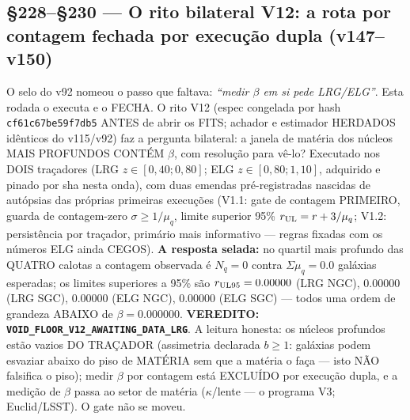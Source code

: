 \documentclass[11pt]{article}
\theoremstyle{definition}\newtheorem{deriv}{Derivação}
\begin{document}
\subsection*{\S228--\S230 --- O rito bilateral V12: a rota por contagem fechada por execução dupla (v147--v150)}O selo do v92 nomeou o passo que faltava: \emph{``medir $\beta$ em si pede LRG/ELG''}. Esta rodada o executa e o FECHA. O rito V12 (espec congelada por hash \texttt{cf61c67be59f7db5} ANTES de abrir os FITS; achador e estimador HERDADOS idênticos do v115/v92) faz a pergunta bilateral: a janela de matéria dos núcleos MAIS PROFUNDOS CONTÉM $\beta$, com resolução para vê-lo? Executado nos DOIS traçadores (LRG $z\in[0{,}40;0{,}80]$; ELG $z\in[0{,}80;1{,}10]$, adquirido e pinado por sha nesta onda), com duas emendas pré-registradas nascidas de autópsias das próprias primeiras execuções (V1.1: gate de contagem PRIMEIRO, guarda de contagem-zero $\sigma\ge1/\mu_q$, limite superior 95\% $r_{\rm UL}=r+3/\mu_q$; V1.2: persistência por traçador, primário mais informativo --- regras fixadas com os números ELG ainda CEGOS). \textbf{A resposta selada:} no quartil mais profundo das QUATRO calotas a contagem observada é $N_q=0$ contra $\Sigma\mu_q=0.0$ galáxias esperadas; os limites superiores a 95\% são $r_{\rm UL95}=0.00000$ (LRG NGC), $0.00000$ (LRG SGC), $0.00000$ (ELG NGC), $0.00000$ (ELG SGC) --- todos uma ordem de grandeza ABAIXO de $\beta=0.000000$. \textbf{VEREDITO: \texttt{VOID\_FLOOR\_V12\_AWAITING\_DATA\_LRG}}. A leitura honesta: os núcleos profundos estão vazios DO TRAÇADOR (assimetria declarada $b\ge1$: galáxias podem esvaziar abaixo do piso de MATÉRIA sem que a matéria o faça --- isto NÃO falsifica o piso); medir $\beta$ por contagem está EXCLUÍDO por execução dupla, e a medição de $\beta$ passa ao setor de matéria ($\kappa$/lente --- o programa V3; Euclid/LSST). O gate não se moveu.
\end{document}

